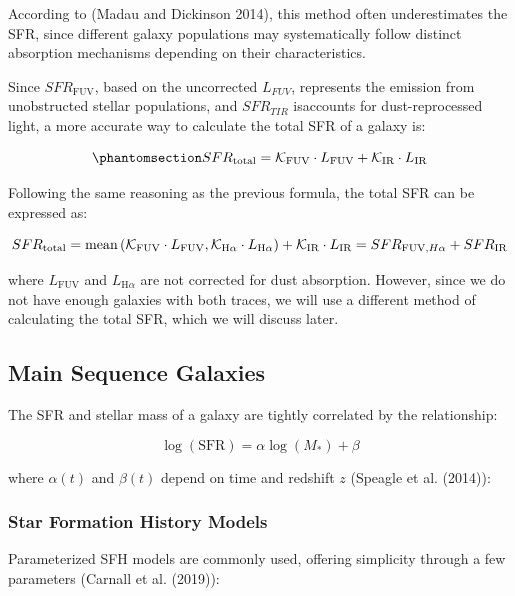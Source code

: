 \documentclass[
]{article}
\begin{document}
According to (Madau and Dickinson 2014), this method often
underestimates the SFR, since different galaxy populations may
systematically follow distinct absorption mechanisms depending on their
characteristics.

Since \(SFR_{\text{FUV}}\), based on the uncorrected \(L_{FUV}\),
represents the emission from unobstructed stellar populations, and
\(SFR_{TIR}\) isaccounts for dust-reprocessed light, a more accurate way
to calculate the total SFR of a galaxy is:

\begin{equation}\phantomsection\label{eq-SFR_tot_madau}{
SFR_{\text{total}} = \mathcal{K}_{\text{FUV}} \cdot L_{\text{FUV}} + \mathcal{K}_{\text{IR}} \cdot L_{\text{IR}}
}\end{equation}

Following the same reasoning as the previous formula, the total SFR can
be expressed as:

\[
SFR_{\text{total}} = \text{mean}\left(\mathcal{K}_{\text{FUV}} \cdot L_{\text{FUV}}, \mathcal{K}_{\text{H}\alpha} \cdot L_{\text{H}\alpha}\right) + \mathcal{K}_{\text{IR}} \cdot L_{\text{IR}} \\
= SFR_{\text{FUV},H\alpha}+ SFR_{\text{IR}}
\]

where \(L_{\text{FUV}}\) and \(L_{\text{H}\alpha}\) are not corrected
for dust absorption. However, since we do not have enough galaxies with
both traces, we will use a different method of calculating the total
SFR, which we will discuss later.

\subsection{Main Sequence Galaxies}\label{main-sequence-galaxies}

The SFR and stellar mass of a galaxy are tightly correlated by the
relationship:

\[
\log(\text{SFR}) = \alpha \log(M_*)+\beta
\]

where \(\alpha(t)\) and \(\beta(t)\) depend on time and redshift \(z\)
(Speagle et al. (2014)):

\subsubsection{Star Formation History
Models}\label{star-formation-history-models}

Parameterized SFH models are commonly used, offering simplicity through
a few parameters (Carnall et al. (2019)):
\end{document}
